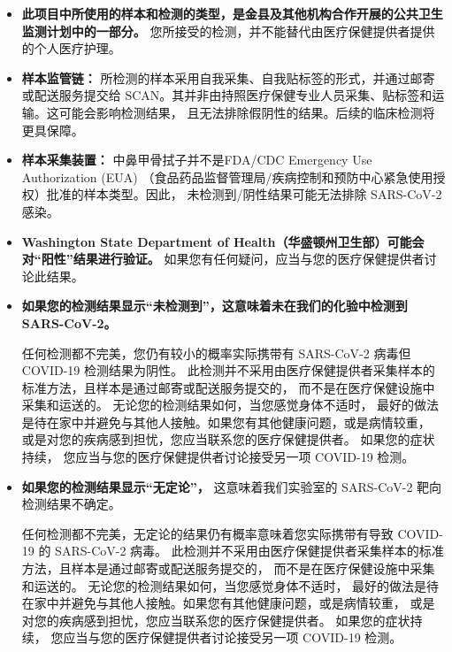 \documentclass[10pt]{article}
\begin{document}
\begin{itemize}
\item

  \textbf{此项目中所使用的样本和检测的类型，是金县及其他机构合作开展的公共卫生监测计划中的一部分。}
  您所接受的检测，并不能替代由医疗保健提供者提供的个人医疗护理。

\item

  \textbf{样本监管链：} 所检测的样本采用自我采集、自我贴标签的形式，并通过邮寄或配送服务提交给
  SCAN。其并非由持照医疗保健专业人员采集、贴标签和运输。这可能会影响检测结果，
  且无法排除假阴性的结果。后续的临床检测将更具保障。

\item

  \textbf{样本采集装置：} 中鼻甲骨拭子并不是FDA/CDC Emergency Use Authorization (EUA)
  （食品药品监督管理局/疾病控制和预防中心紧急使用授权）批准的样本类型。因此，
  未检测到/阴性结果可能无法排除 SARS-CoV-2 感染。

\item

  \textbf{Washington State Department of Health（华盛顿州卫生部）可能会对``阳性''结果进行验证。}
  如果您有任何疑问，应当与您的医疗保健提供者讨论此结果。

\item{
  \textbf{如果您的检测结果显示``未检测到''，这意味着未在我们的化验中检测到 SARS-CoV-2。}

  任何检测都不完美，您仍有较小的概率实际携带有 SARS-CoV-2 病毒但 COVID-19 检测结果为阴性。
  此检测并不采用由医疗保健提供者采集样本的标准方法，且样本是通过邮寄或配送服务提交的，
  而不是在医疗保健设施中采集和运送的。 无论您的检测结果如何，当您感觉身体不适时，
  最好的做法是待在家中并避免与其他人接触。如果您有其他健康问题，或是病情较重，
  或是对您的疾病感到担忧，您应当联系您的医疗保健提供者。 如果您的症状持续，
  您应当与您的医疗保健提供者讨论接受另一项 COVID-19 检测。
}

\item

  \textbf{如果您的检测结果显示``无定论''，} 这意味着我们实验室的 SARS-CoV-2
  靶向检测结果不确定。

  任何检测都不完美，无定论的结果仍有概率意味着您实际携带有导致 COVID-19 的 SARS-CoV-2 病毒。
  此检测并不采用由医疗保健提供者采集样本的标准方法，且样本是通过邮寄或配送服务提交的，
  而不是在医疗保健设施中采集和运送的。 无论您的检测结果如何，当您感觉身体不适时，
  最好的做法是待在家中并避免与其他人接触。如果您有其他健康问题，或是病情较重，
  或是对您的疾病感到担忧，您应当联系您的医疗保健提供者。 如果您的症状持续，
  您应当与您的医疗保健提供者讨论接受另一项 COVID-19 检测。


\end{itemize}
\end{document}
